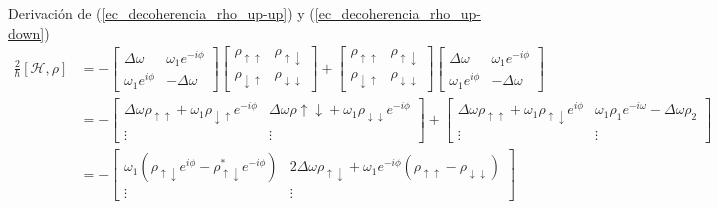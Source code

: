 \documentclass[a4paper,11pt]{book} %
\numberwithin{equation}{chapter}
\def\lp{\left(}
\def\rp{\right)}
\def\lc{\left[}
\def\rc{\right]}
\begin{document}
	\begin{mybox_green}{Derivación de (\ref{ec_decoherencia_rho_up-up}) y  (\ref{ec_decoherencia_rho_up-down})}
		\begin{align*}
		\frac{2}{\hbar}\lc \mathcal{H} , \rho \rc & = - 
		\begin{bmatrix}
		\Delta \omega & \omega_1 e^{-i \phi} \\
		\omega_1 e^{i \phi} & - \Delta \omega
		\end{bmatrix} 
		\begin{bmatrix}
		\rho_{\uparrow \uparrow} & \rho_{\uparrow \downarrow} \\
		\rho_{\downarrow \uparrow} & \rho_{\downarrow \downarrow}
		\end{bmatrix}
		+
		\begin{bmatrix}
		\rho_{\uparrow \uparrow} & \rho_{\uparrow \downarrow} \\
		\rho_{\downarrow \uparrow} & \rho_{\downarrow \downarrow}
		\end{bmatrix}
		\begin{bmatrix}
		\Delta \omega & \omega_1 e^{-i \phi} \\
		\omega_1 e^{i \phi} & - \Delta \omega
		\end{bmatrix}  \\
		& = -  \begin{bmatrix}
		\Delta \omega \rho_{\uparrow \uparrow} +
		\omega_1 \rho_{\downarrow \uparrow} e^{-i \phi} 
		& \Delta \omega \rho{\uparrow \downarrow} + \omega_1 \rho_{\downarrow \downarrow} e^{-i \phi} \\
		\vdots & \vdots
		\end{bmatrix}
		+  \begin{bmatrix}
		\Delta \omega \rho_{\uparrow \uparrow} + \omega_1 \rho_{\uparrow \downarrow} e^{i \phi} & \omega_1 \rho_1 e^{-i \omega} - \Delta \omega \rho_2 \\
		\vdots & \vdots 
		\end{bmatrix} \\
		& = - \begin{bmatrix}
		\omega_1 \lp \rho_{\uparrow \downarrow} e^{i \phi} - \rho^{*}_{\uparrow \downarrow} e^{-i \phi} \rp & 
		2 \Delta \omega \rho_{\uparrow \downarrow} + \omega_1 e^{-i \phi} \lp \rho_{\uparrow \uparrow} - \rho_{\downarrow \downarrow} \rp \\
		\vdots & \vdots
		\end{bmatrix}
		\end{align*}
	\end{mybox_green}
\end{document}
